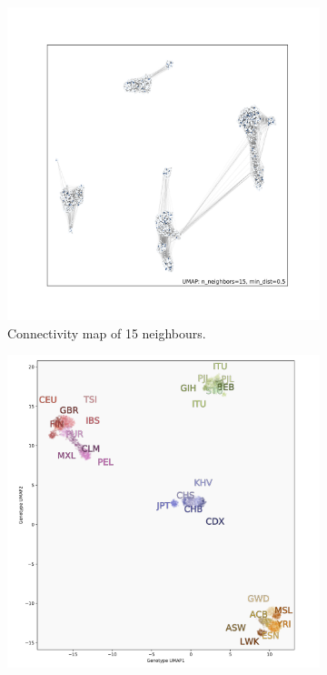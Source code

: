 \documentclass[12pt]{article}
\begin{document}
\begin{figure}[h!]
\begin{subfigure}[b]{0.48\linewidth}
    \includegraphics[width=\linewidth]{code/images/UMAP_connectivity_low_NN.png}
    \caption{Connectivity map of 15 neighbours.}
    \label{fig:UMAP_low_NN_connectivity}
  \end{subfigure}
  \begin{subfigure}[b]{0.48\linewidth}
    \includegraphics[width=\linewidth]{code/images/1KGP_genotype_UMAP_high_NN.png}

\end{subfigure}
\end{figure}
\end{document}
